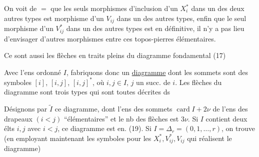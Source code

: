 On voit de $=$ que les seuls morphismes d'inclusion d'un $X_i^*$ dans un des deux autres types est
  morphisme d'un $V_{ij}$ dans un des autres types,  enfin que le seul morphisme d'un $V_{ij}^*$ dans un des autres types est
en définitive, il n'y a pas lieu d'envisager d'autres morphismes entre ces  topos-pierres élémentaires.


Ce sont aussi les  flèches en traits pleins du diagramme fondamental (17)

Avec l'ens ordonné $I$, fabriquons donc un  \uline{diagramme} dont les sommets sont  des symboles  $[i]$, $[i,j]$, $[i,j]^*$, où $i,j\in I$, $j$ un succ. de $i$. Les flèches du diagramme sont  trois types qui sont toutes décrites ds

Désignons par $\widetilde I$ ce diagramme, dont l'ens des sommets     $\operatorname{card}I+2\nu$   de l'ens des drapeaux $(i<j)$ ``élémentaires''  et le nb des flèches est $3\nu$. Si $I$ contient  deux élts $i,j$ avec $i<j$,  ce diagramme est en. (19). Si $I=\Delta_r=(0,1,\ldots,r)$, on trouve (en employant maintenant les symboles pour les $X_i^*,V_{ij}^*,V_{ij}$ qui réalisent le diagramme)

